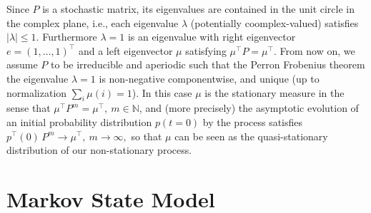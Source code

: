 \documentclass[aps, pre, preprint,unsortedaddress,a4paper,onecolumn]{revtex4}
\newcommand{\vect}[1]{#1}
\newcommand{\mymu}{\mu}
\begin{document}
Since $P$ is a stochastic matrix, its eigenvalues are contained in the unit circle in
the complex plane, i.e., each eigenvalue $\lambda$ (potentially coomplex-valued)
satisfies $|\lambda|\le 1$. Furthermore $\lambda=1$ is an
eigenvalue with right eigenvector $\vect e=(1,\ldots,1)^{\top}$ and a left eigenvector $\mymu$
satisfying
$\mymu^{\top}P=\mymu^{\top}$.
From now on, we assume $P$ to be irreducible and aperiodic such that the Perron Frobenius theorem the eigenvalue $\lambda=1$ is  non-negative componentwise, and unique (up to normalization $\sum_i\mu(i)=1$). In this case $\mymu$ is the stationary measure in the sense that
$
 \mymu^{\top} P^m = \mymu^{\top},\ m\in\mathbb N
$,
and (more precisely) the asymptotic evolution of an initial probability distribution $\vect p(t=0)$ by the process satisfies
$
\vect p^{\top}(0)\,P^m \to \mymu^{\top},\ m\to\infty,
$
so that $\mymu$ can be seen as the quasi-stationary distribution of our non-stationary process.



\section{Markov State Model}
\label{sec:build-msm}
\end{document}
